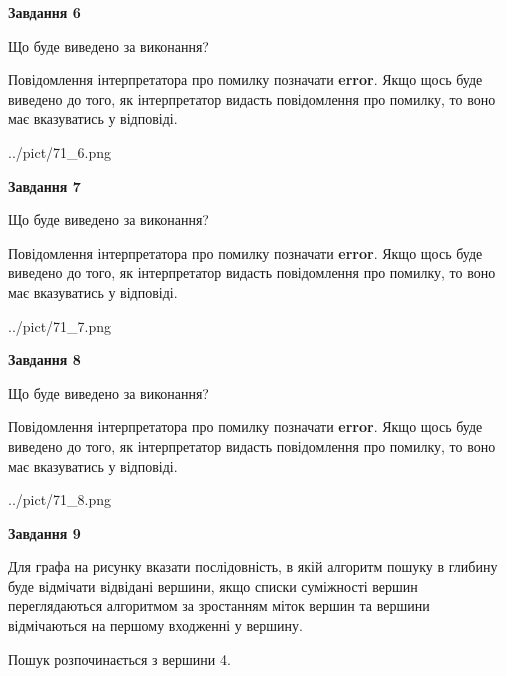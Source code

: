 \documentclass[12pt, ukrainian]{article}
\begin{document}
{\begin {large}
{\begin {center}\textbf{Завдання 6}\end {center}}\par
Що буде виведено за виконання?

Повідомлення інтерпретатора про помилку позначати \textbf{error}.
Якщо щось буде виведено до того, як інтерпретатор видасть повідомлення про помилку, 
то воно має вказуватись у відповіді. \par


\begin{center}
	{../pict/71_6.png}
\end{center}
\newpage

{\begin {center}\textbf{Завдання 7}\end {center}}\par
Що буде виведено за виконання?

Повідомлення інтерпретатора про помилку позначати \textbf{error}.
Якщо щось буде виведено до того, як інтерпретатор видасть повідомлення про помилку, 
то воно має вказуватись у відповіді. \par


\begin{center}
	{../pict/71_7.png}
\end{center}
\newpage

{\begin {center}\textbf{Завдання 8}\end {center}}\par
Що буде виведено за виконання?

Повідомлення інтерпретатора про помилку позначати \textbf{error}.
Якщо щось буде виведено до того, як інтерпретатор видасть повідомлення про помилку, 
то воно має вказуватись у відповіді. \par


\begin{center}
	{../pict/71_8.png}
\end{center}
\newpage

{\begin {center}\textbf{Завдання 9}\end {center}}\par
Для графа на рисунку вказати послідовність, в якій алгоритм пошуку в глибину буде відмічати відвідані вершини, якщо списки суміжності вершин переглядаються алгоритмом за зростанням міток вершин та вершини відмічаються на першому вход\-женні у вершину.\par
Пошук розпочинається з вершини 4.\par


\end{large}}
\end{document}
